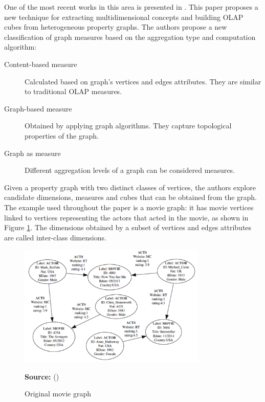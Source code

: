 One of the most recent works in this area is presented in \cite{ghrab2015framework}. This paper proposes a new technique for extracting multidimensional concepts and building OLAP cubes from heterogeneous property graphs. The authors propose a new classification of graph measures based on the aggregation type and computation algorithm:
\begin{description}
\item[Content-based measure] Calculated based on graph's vertices and edges attributes. They are similar to traditional OLAP measures.
\item[Graph-based measure] Obtained by applying graph algorithms. They capture topological properties of the graph.
\item[Graph as measure] Different aggregation levels of a graph can be considered measures.
\end{description}

Given a property graph with two distinct classes of vertices, the authors explore candidate dimensions, measures and cubes that can be obtained from the graph. The example used throughout the paper is a movie graph: it has movie vertices linked to vertices representing the actors that acted in the movie, as shown in Figure \ref{fig:figure21}. The dimensions obtained by a subset of vertices and edges attributes are called inter-class dimensions.

\begin{figure}[ht]
\centering
\caption{Original movie graph}
\label{fig:figure21}
\includegraphics[width=0.8\textwidth]{images/movie_graph.png}
\par\medskip\ABNTEXfontereduzida\selectfont\textbf{Source:} \citeauthor{ghrab2015framework} (\citeyear{ghrab2015framework}) \par\medskip
\end{figure}

